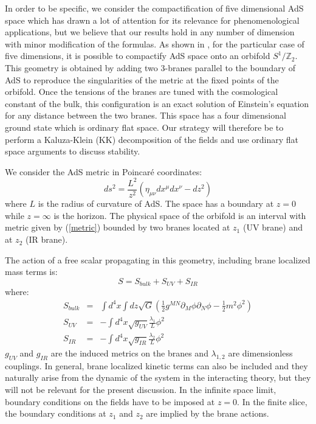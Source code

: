 \documentclass[a4paper,12pt,dvips]{article}
\begin{document}
In order to be specific, we consider the compactification of five
dimensional AdS space which has drawn a lot of attention for its
relevance for phenomenological applications, but we believe that
our results hold in any number of dimension with minor
modification of the formulas.
 As shown in \cite{RS1}, for the
particular case of five dimensions, it is possible to compactify
AdS space onto an orbifold $S^1/\mathbb{Z}_2$. This geometry is
obtained by adding two 3-branes parallel to the boundary of AdS to
reproduce the singularities of the metric at the fixed points of
the orbifold. Once the tensions of the branes are tuned with the
cosmological constant of the bulk, this configuration is an exact
solution of Einstein's equation for any distance between the two
branes. This space has a four dimensional ground state which is
ordinary flat space. Our strategy will therefore be to perform a
Kaluza-Klein  (KK) decomposition of the fields and use ordinary
flat space arguments to discuss stability.


We consider the AdS metric in Poincar\'e coordinates:
\begin{equation}
ds^2=\frac {L^2} {z^2} (\eta_{\mu \nu}dx^\mu dx^\nu-dz^2)
\label{metric}
\end{equation}
where $L$ is the radius of curvature of AdS. The space has a
boundary at $z=0$ while $z=\infty$ is the horizon. The physical
space of the orbifold is an interval with metric given by
(\ref{metric}) bounded by two branes located at $z_1$ (UV brane)
and at $z_2$ (IR brane).

 The action of a free
scalar propagating in this geometry, including brane localized
mass terms is:
\begin{equation}
S=S_{bulk}+S_{UV}+S_{IR}
\label{action}
\end{equation}
where:
\begin{eqnarray}
S_{bulk}&=&\int d^4x \int dz \sqrt{G}(\frac 1 2  g^{M N}
\partial_M \phi
\partial_N \phi-\frac 1 2 m^2 \phi^2)\nonumber\\
S_{UV}&=&-\int d^4x \sqrt{g_{UV}} \frac {\lambda_1} {L} \phi^2\nonumber
\\
S_{IR}&=&-\int d^4x \sqrt{g_{IR}}\frac {\lambda_2} {L} \phi^2
\end{eqnarray}
$g_{UV}$ and $g_{IR}$ are the induced metrics on the branes and
$\lambda_{1,2}$ are dimensionless couplings. In general, brane
localized kinetic terms can also be included and they naturally
arise from the dynamic of the system in the interacting theory,
but they will not be relevant for the present discussion. In the
infinite space limit, boundary conditions on the fields have to be
imposed at $z=0$. In the finite slice, the boundary conditions at
$z_1$ and $z_2$ are implied by the brane actions.
\end{document}
